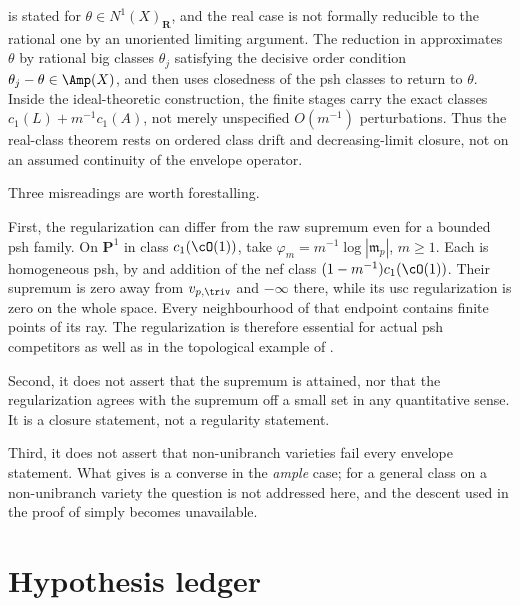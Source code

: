 \begin{remark}
\label{rem:ch37-real-classes}
 is stated for
$\theta\in N^1(X)_{\mathbf R}$, and the real case is not formally reducible
to the rational one by an unoriented limiting argument.  The reduction in
 approximates $\theta$ by rational big
classes $\theta_j$ satisfying the decisive order condition
$\theta_j-\theta\in\Amp(X)$, and then uses closedness of the psh classes
to return to $\theta$.  Inside the ideal-theoretic construction, the
finite stages carry the exact classes $c_1(L)+m^{-1}c_1(A)$, not merely
unspecified $O(m^{-1})$ perturbations.  Thus the real-class theorem rests
on ordered class drift and decreasing-limit closure, not on an assumed
continuity of the envelope operator.
\end{remark}

\begin{remark}
\label{rem:ch37-not-said}
Three misreadings are worth forestalling.

First, the regularization can differ from the raw supremum even for a
bounded psh family. On $\mathbf P^1$ in class $c_1(\cO(1))$, take
$\varphi_m=m^{-1}\log|\mathfrak m_p|$, $m\geq1$. Each is homogeneous
psh, by  and addition of the nef class
$(1-m^{-1})c_1(\cO(1))$. Their supremum is zero away from
$v_{p,\triv}$ and $-\infty$ there, while its usc regularization is zero
on the whole space. Every neighbourhood of that endpoint contains finite
points of its ray. The regularization is therefore essential for actual
psh competitors as well as in the topological example of
.

Second, it does not assert that the supremum is attained, nor that the
regularization agrees with the supremum off a small set in any quantitative
sense.  It is a closure statement, not a regularity statement.

Third, it does not assert that non-unibranch varieties fail every envelope
statement.  What  gives is a converse in the
\emph{ample} case; for a general class on a non-unibranch variety the
question is not addressed here, and the descent used in the proof of
 simply becomes unavailable.
\end{remark}

\section{Hypothesis ledger}
\label{sec:ch37-hypothesis-ledger}

